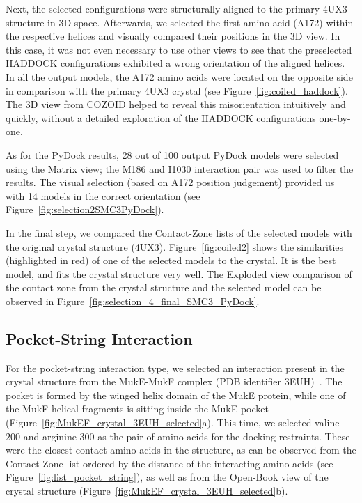 \documentclass{bmcart}
\def\OpBook {Open-Book view\xspace}
\def\ExpView {Exploded view\xspace}
\def\MatView {Matrix view\xspace}
\def\CoZoList{Contact-Zone list\xspace}
\def\CoZoLists{Contact-Zone lists\xspace}
\begin{document}
Next, the selected configurations were structurally aligned to the primary 4UX3 structure in 3D space.
Afterwards, we selected the first amino acid (A172) within the respective helices and visually compared their positions in the 3D view.
In this case, it was not even necessary to use other views to see that the preselected HADDOCK configurations exhibited a wrong orientation of the aligned helices. 
In all the output models, the A172 amino acids were located on the opposite side in comparison with the primary 4UX3 crystal (see Figure~\ref{fig:coiled_haddock}). 
The 3D view from COZOID helped to reveal this misorientation intuitively and quickly, without a detailed exploration of the HADDOCK configurations one-by-one.

As for the PyDock results, 28 out of 100 output PyDock models were selected using the \MatView; the M186 and I1030 interaction pair was used to filter the results.
The visual selection (based on A172 position judgement) provided us with 14 models in the correct orientation (see Figure~\ref{fig:selection2SMC3PyDock}).

In the final step, we compared the \CoZoLists of the selected models with the original crystal structure (4UX3). 
Figure~\ref{fig:coiled2} shows the similarities (highlighted in red) of one of the selected models to the crystal. It is the best model, and fits the crystal structure very well. The \ExpView comparison of the contact zone from the crystal structure and the selected model can be observed in Figure~\ref{fig:selection_4_final_SMC3_PyDock}.

\subsection*{Pocket-String Interaction}
For the pocket-string interaction type, we selected an interaction present in the crystal structure from the MukE-MukF complex (PDB identifier 3EUH)~\cite{Woo}. 
The pocket is formed by the winged helix domain of the MukE protein, while one of the MukF helical fragments is sitting inside the MukE pocket (Figure~\ref{fig:MukEF_crystal_3EUH_selected}a). 
This time, we selected valine 200 and arginine 300 as the pair of amino acids for the docking restraints. 
These were the closest contact amino acids in the structure, as can be observed from the \CoZoList ordered by the distance of the interacting amino acids (see Figure~\ref{fig:list_pocket_string}), as well as from the \OpBook of the crystal structure (Figure~\ref{fig:MukEF_crystal_3EUH_selected}b). 
\end{document}
